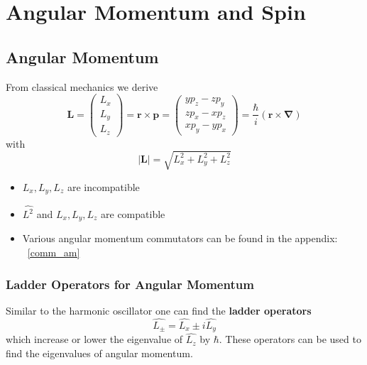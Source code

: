\section{Angular Momentum and Spin}
\subsection{Angular Momentum}


From classical mechanics we derive
\begin{equation*}
    \mathbf{L}=
    \begin{pmatrix}
        L_x \\
        L_y \\
        L_z
    \end{pmatrix}
    =\mathbf{r}\times\mathbf{p}
    =
    \begin{pmatrix}
        yp_z-zp_y \\
        zp_x-xp_z \\
        xp_y-yp_x
    \end{pmatrix}
    =\frac{\hbar}{i}(\mathbf{r}\times\mathbf{\nabla})
\end{equation*}
with
\begin{equation*}
    |\mathbf{L}|=\sqrt{L_{x}^{2}+L_{y}^{2}+L_{z}^{2}}
\end{equation*}


\begin{itemize}
    \item $L_x, L_y, L_z$ are incompatible
    \item $\hat{L^2}$ and $L_x, L_y, L_z$ are compatible
    \item Various angular momentum commutators can be found in the appendix: ~\ref{comm_am}
\end{itemize}

\subsubsection{Ladder Operators for Angular Momentum}

Similar to the harmonic oscillator one can find the \textbf{ladder operators}
\begin{equation*}
    \widehat{L_{\pm}}=\widehat{L_{x}}\pm i \widehat{L_y}
\end{equation*}
which increase or lower the eigenvalue of $\widehat{L_{z}}$ by $\hbar$. These operators can be used to find the eigenvalues of angular momentum.

